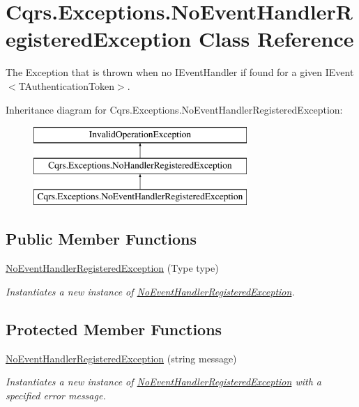 \hypertarget{classCqrs_1_1Exceptions_1_1NoEventHandlerRegisteredException}{}\section{Cqrs.\+Exceptions.\+No\+Event\+Handler\+Registered\+Exception Class Reference}
\label{classCqrs_1_1Exceptions_1_1NoEventHandlerRegisteredException}


The Exception that is thrown when no I\+Event\+Handler if found for a given I\+Event$<$\+T\+Authentication\+Token$>$.  


Inheritance diagram for Cqrs.\+Exceptions.\+No\+Event\+Handler\+Registered\+Exception\+:\begin{figure}[H]
\begin{center}
\leavevmode
\includegraphics[height=3.000000cm]{classCqrs_1_1Exceptions_1_1NoEventHandlerRegisteredException}
\end{center}
\end{figure}
\subsection*{Public Member Functions}
\begin{DoxyCompactItemize}
\item 
\hyperlink{classCqrs_1_1Exceptions_1_1NoEventHandlerRegisteredException_a8b0073d3afdffd45293c856b14806b46_a8b0073d3afdffd45293c856b14806b46}{No\+Event\+Handler\+Registered\+Exception} (Type type)
\begin{DoxyCompactList}\small\item\em Instantiates a new instance of \hyperlink{classCqrs_1_1Exceptions_1_1NoEventHandlerRegisteredException}{No\+Event\+Handler\+Registered\+Exception}. \end{DoxyCompactList}\end{DoxyCompactItemize}
\subsection*{Protected Member Functions}
\begin{DoxyCompactItemize}
\item 
\hyperlink{classCqrs_1_1Exceptions_1_1NoEventHandlerRegisteredException_a3b57a958403c3068e8811dc935148b86_a3b57a958403c3068e8811dc935148b86}{No\+Event\+Handler\+Registered\+Exception} (string message)
\begin{DoxyCompactList}\small\item\em Instantiates a new instance of \hyperlink{classCqrs_1_1Exceptions_1_1NoEventHandlerRegisteredException}{No\+Event\+Handler\+Registered\+Exception} with a specified error message. \end{DoxyCompactList}\end{DoxyCompactItemize}


